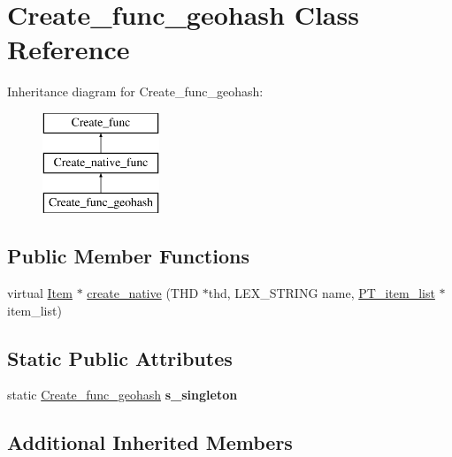 \hypertarget{classCreate__func__geohash}{}\section{Create\+\_\+func\+\_\+geohash Class Reference}
\label{classCreate__func__geohash}
Inheritance diagram for Create\+\_\+func\+\_\+geohash\+:\begin{figure}[H]
\begin{center}
\leavevmode
\includegraphics[height=3.000000cm]{classCreate__func__geohash}
\end{center}
\end{figure}
\subsection*{Public Member Functions}
\begin{DoxyCompactItemize}
\item 
virtual \mbox{\hyperlink{classItem}{Item}} $\ast$ \mbox{\hyperlink{classCreate__func__geohash_aba1f0c13d0c25590b1e9f591845b4e3f}{create\+\_\+native}} (T\+HD $\ast$thd, L\+E\+X\+\_\+\+S\+T\+R\+I\+NG name, \mbox{\hyperlink{classPT__item__list}{P\+T\+\_\+item\+\_\+list}} $\ast$item\+\_\+list)
\end{DoxyCompactItemize}
\subsection*{Static Public Attributes}
\begin{DoxyCompactItemize}
\item 
\mbox{\label{classCreate__func__geohash_a6d7958ad772e1dcd52d28edd99eda54e}} 
static \mbox{\hyperlink{classCreate__func__geohash}{Create\+\_\+func\+\_\+geohash}} {\bfseries s\+\_\+singleton}
\end{DoxyCompactItemize}
\subsection*{Additional Inherited Members}


